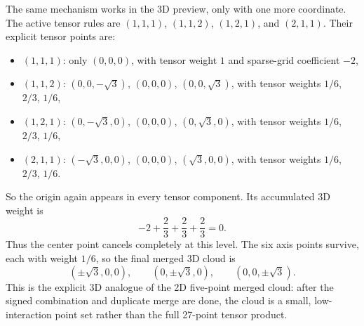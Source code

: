 \documentclass[11pt]{article}
\numberwithin{equation}{section}
\begin{document}
The same mechanism works in the 3D preview, only with one more coordinate.  The
active tensor rules are \((1,1,1)\), \((1,1,2)\), \((1,2,1)\), and \((2,1,1)\).
Their explicit tensor points are:
\begin{itemize}[leftmargin=0.28in]
  \item \((1,1,1)\): only \((0,0,0)\), with tensor weight \(1\) and sparse-grid
  coefficient \(-2\),
  \item \((1,1,2)\): \((0,0,-\sqrt3)\), \((0,0,0)\), \((0,0,\sqrt3)\),
  with tensor weights \(1/6\), \(2/3\), \(1/6\),
  \item \((1,2,1)\): \((0,-\sqrt3,0)\), \((0,0,0)\), \((0,\sqrt3,0)\),
  with tensor weights \(1/6\), \(2/3\), \(1/6\),
  \item \((2,1,1)\): \((-\sqrt3,0,0)\), \((0,0,0)\), \((\sqrt3,0,0)\),
  with tensor weights \(1/6\), \(2/3\), \(1/6\).
\end{itemize}
So the origin again appears in every tensor component.  Its accumulated 3D weight
is
\begin{equation}
  -2 + \frac23 + \frac23 + \frac23 = 0.
  \label{eq:p38-3d-origin-merge}
\end{equation}
Thus the center point cancels completely at this level.  The six axis points
survive, each with weight \(1/6\), so the final merged 3D cloud is
\begin{equation}
  (\pm\sqrt3,0,0),
  \qquad
  (0,\pm\sqrt3,0),
  \qquad
  (0,0,\pm\sqrt3).
  \label{eq:p38-3d-final-merged-cloud}
\end{equation}
This is the explicit 3D analogue of the 2D five-point merged cloud: after the
signed combination and duplicate merge are done, the cloud is a small,
low-interaction point set rather than the full 27-point tensor product.
\end{document}
